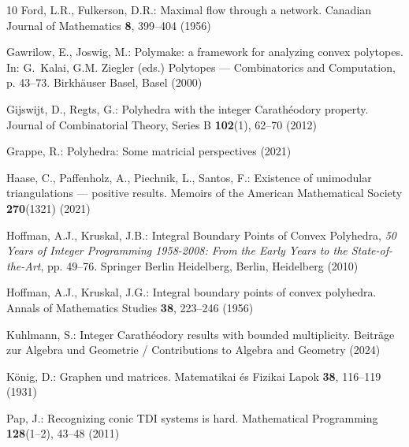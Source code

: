 \documentclass[11pt,a4paper]{amsart}
\theoremstyle{plain}
\theoremstyle{definition}
\begin{document}
\begin{thebibliography}{10}
Ford, L.R., Fulkerson, D.R.: Maximal flow through a network.
\newblock Canadian Journal of Mathematics \textbf{8}, 399–404 (1956)

Gawrilow, E., Joswig, M.: Polymake: a framework for analyzing convex polytopes.
\newblock In: G.~Kalai, G.M. Ziegler (eds.) Polytopes — Combinatorics and
Computation, p. 43–73. Birkhäuser Basel, Basel (2000)

Gijswijt, D., Regts, G.: Polyhedra with the integer Carathéodory property.
\newblock Journal of Combinatorial Theory, Series B \textbf{102}(1), 62–70
(2012)

Grappe, R.: Polyhedra: Some matricial perspectives  (2021)

Haase, C., Paffenholz, A., Piechnik, L., Santos, F.: Existence of unimodular
triangulations — positive results.
\newblock Memoirs of the American Mathematical Society \textbf{270}(1321)
(2021)

Hoffman, A.J., Kruskal, J.B.: Integral Boundary Points of Convex Polyhedra, \emph{50 Years of Integer Programming 1958-2008: From the Early Years to the State-of-the-Art}, pp.
49--76.
\newblock Springer Berlin Heidelberg, Berlin, Heidelberg (2010)

Hoffman, A.J., Kruskal, J.G.: Integral boundary points of convex polyhedra.
\newblock Annals of Mathematics Studies \textbf{38}, 223–246 (1956)

Kuhlmann, S.: Integer {Carath\'e}odory results with bounded multiplicity.
\newblock Beiträge zur Algebra und Geometrie / Contributions to Algebra and
Geometry  (2024)

König, D.: Graphen und matrices.
\newblock Matematikai és Fizikai Lapok \textbf{38}, 116–119 (1931)

Pap, J.: Recognizing conic {TDI} systems is hard.
\newblock Mathematical Programming \textbf{128}(1–2), 43–48 (2011)


\end{thebibliography}
\end{document}
